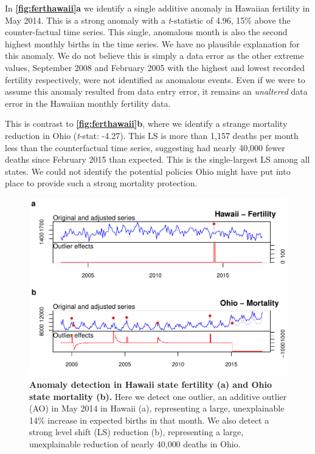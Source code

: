 \documentclass[12pt]{article}
\begin{document}
In \textbf{\autoref{fig:ferthawaii}a} we identify a single additive
anomaly in Hawaiian fertility in May 2014. This is a strong anomaly with
a \emph{t}-statistic of 4.96, 15\% above the counter-factual time
series. This single, anomalous month is also the second highest monthly
births in the time series. We have no plausible explanation for this
anomaly. We do not believe this is simply a data error as the other
extreme values, September 2008 and February 2005 with the highest and
lowest recorded fertility respectively, were not identified as anomalous
events. Even if we were to assume this anomaly resulted from data entry
error, it remains an \emph{unaltered} data error in the Hawaiian monthly
fertility data.

This is contrast to \textbf{\autoref{fig:ferthawaii}b}, where we
identify a strange mortality reduction in Ohio (\emph{t}-stat: -4.27).
This LS is more than 1,157 deaths per month less than the counterfactual
time series, suggesting had nearly 40,000 fewer deaths since February
2015 than expected. This is the single-largest LS among all states. We
could not identify the potential policies Ohio might have put into place
to provide such a strong mortality protection.

\begin{figure}
\centering
\includegraphics{manuscript_files/figure-latex/TrueAnomalies-1.pdf}
\caption{\textbf{Anomaly detection in Hawaii state fertility (a) and Ohio state mortality (b).}
Here we detect one outlier, an additive outlier (AO) in May 2014 in
Hawaii (a), representing a large, unexplainable 14\% increase in
expected births in that month. We also detect a strong level shift (LS)
reduction (b), representing a large, unexplainable reduction of nearly
40,000 deaths in Ohio. \label{fig:ferthawaii}}
\end{figure}
\end{document}
